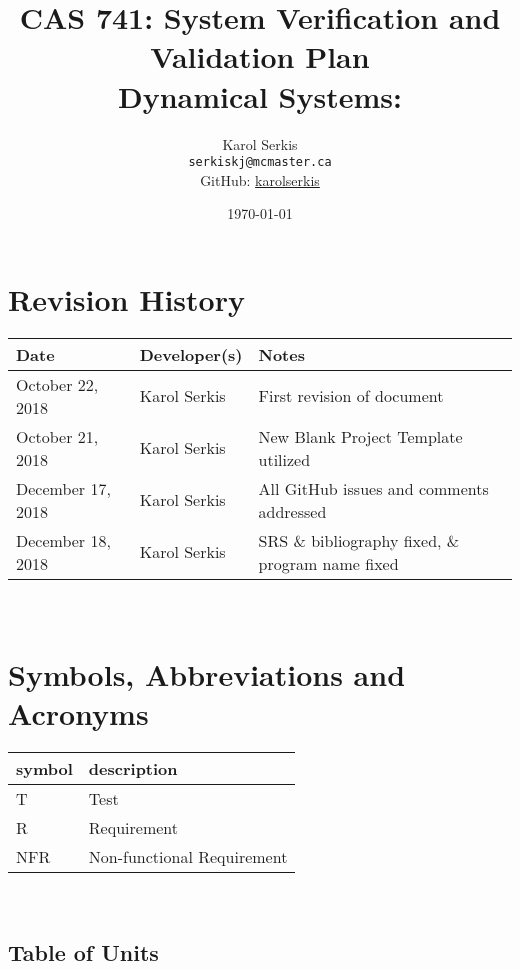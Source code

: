 \documentclass[12pt, titlepage]{article}
\begin{document}
\title{CAS 741: System Verification and Validation Plan\\[10pt]
\Large Dynamical Systems: \progname}
\author{Karol Serkis\\\texttt{serkiskj@mcmaster.ca}\\GitHub:
\href{https://www.github.com/karolserkis}{karolserkis}}
\date{\today}
	
\maketitle


\section{Revision History}

\begin{tabularx}{\textwidth}{p{3.3cm}p{2.5cm}X}
\toprule {\bf Date} & {\bf Developer(s)} & {\bf Notes}\\
\midrule
October 22, 2018 & Karol Serkis & First revision of document\\
October 21, 2018 & Karol Serkis & New Blank Project Template utilized \\
December 17, 2018 & Karol Serkis & All GitHub issues and comments addressed \\
December 18, 2018 & Karol Serkis & SRS \& bibliography fixed, 
\& program name fixed \\
\bottomrule
\end{tabularx}

~\newpage

\section{Symbols, Abbreviations and Acronyms}

\renewcommand{\arraystretch}{1.2}
\begin{tabular}{l l} 
  \toprule		
  \textbf{symbol} & \textbf{description}\\
  \midrule 
  T & Test\\
  R & Requirement\\ 
  NFR & Non-functional Requirement\\ 
  \bottomrule
\end{tabular}\\

\subsection{Table of Units}
\end{document}
